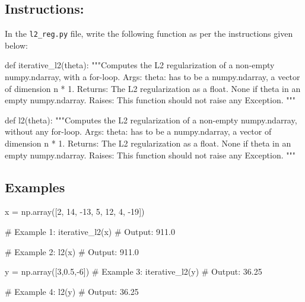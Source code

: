 \documentclass[]{article}
\newenvironment{Shaded}{\begin{snugshade}}{\end{snugshade}}
\newcommand{\CommentTok}[1]{\textcolor[rgb]{0.48,0.49,0.49}{#1}}
\newcommand{\DecValTok}[1]{\textcolor[rgb]{0.96,0.45,0.00}{#1}}
\newcommand{\FloatTok}[1]{\textcolor[rgb]{0.96,0.45,0.00}{#1}}
\newcommand{\KeywordTok}[1]{\textcolor[rgb]{0.81,0.81,0.76}{#1}}
\newcommand{\NormalTok}[1]{\textcolor[rgb]{0.81,0.81,0.76}{#1}}
\newcommand{\OperatorTok}[1]{\textcolor[rgb]{0.81,0.81,0.76}{#1}}
\begin{document}
\hypertarget{instructions-3}{%
\subsection{Instructions:}\label{instructions-3}}

In the \texttt{l2\_reg.py} file, write the following function as per the
instructions given below:

\begin{Shaded}
\begin{Highlighting}[]
\KeywordTok{def}\NormalTok{ iterative_l2(theta):}
    \CommentTok{"""Computes the L2 regularization of a non-empty numpy.ndarray, with a for-loop.}
\CommentTok{    Args:}
\CommentTok{      theta: has to be a numpy.ndarray, a vector of dimension n * 1.}
\CommentTok{    Returns:}
\CommentTok{      The L2 regularization as a float.}
\CommentTok{      None if theta in an empty numpy.ndarray.}
\CommentTok{    Raises:}
\CommentTok{      This function should not raise any Exception.}
\CommentTok{    """}

\KeywordTok{def}\NormalTok{ l2(theta):}
    \CommentTok{"""Computes the L2 regularization of a non-empty numpy.ndarray, without any for-loop.}
\CommentTok{    Args:}
\CommentTok{      theta: has to be a numpy.ndarray, a vector of dimension n * 1.}
\CommentTok{    Returns:}
\CommentTok{      The L2 regularization as a float.}
\CommentTok{      None if theta in an empty numpy.ndarray.}
\CommentTok{    Raises:}
\CommentTok{      This function should not raise any Exception.}
\CommentTok{    """}  
\end{Highlighting}
\end{Shaded}

\hypertarget{examples-3}{%
\subsection{Examples}\label{examples-3}}

\begin{Shaded}
\begin{Highlighting}[]
\NormalTok{x }\OperatorTok{=}\NormalTok{ np.array([}\DecValTok{2}\NormalTok{, }\DecValTok{14}\NormalTok{, }\DecValTok{-13}\NormalTok{, }\DecValTok{5}\NormalTok{, }\DecValTok{12}\NormalTok{, }\DecValTok{4}\NormalTok{, }\DecValTok{-19}\NormalTok{])}

\CommentTok{# Example 1: }
\NormalTok{iterative_l2(x)}
\CommentTok{# Output:}
\FloatTok{911.0}

\CommentTok{# Example 2: }
\NormalTok{l2(x)}
\CommentTok{# Output:}
\FloatTok{911.0}

\NormalTok{y }\OperatorTok{=}\NormalTok{ np.array([}\DecValTok{3}\NormalTok{,}\FloatTok{0.5}\NormalTok{,}\OperatorTok{-}\DecValTok{6}\NormalTok{])}
\CommentTok{# Example 3: }
\NormalTok{iterative_l2(y)}
\CommentTok{# Output:}
\FloatTok{36.25}

\CommentTok{# Example 4: }
\NormalTok{l2(y)}
\CommentTok{# Output:}
\FloatTok{36.25}
\end{Highlighting}
\end{Shaded}
\end{document}
